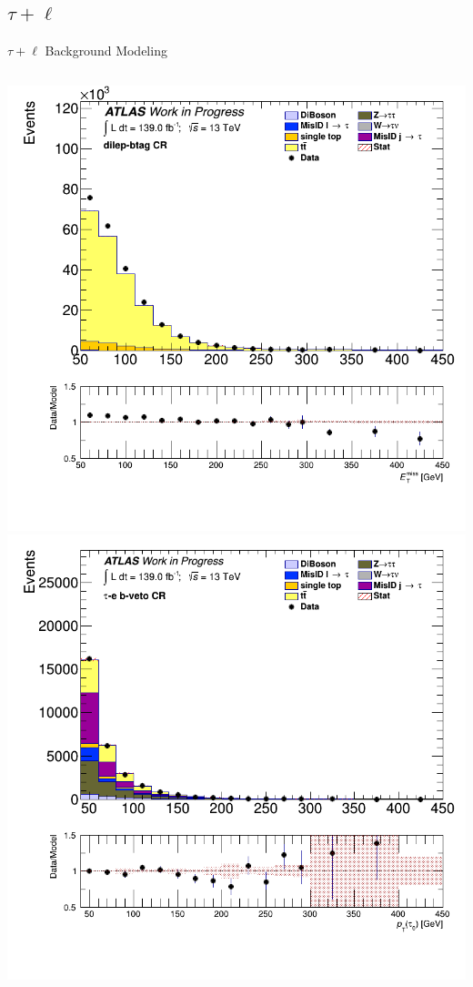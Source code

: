 \documentclass[aspectratio=169,xcolor=table]{beamer}
\begin{document}
    \subsection{$\tau+\ell$}

      \begin{frame}[t]{$\tau+\ell$ Background Modeling}
        \begin{columns}[t]

          \includegraphics[height=.45\textheight,keepaspectratio=true]{taulep_1p_3p/v09/met_et_DILEP_BTAG.png}
          \includegraphics[height=.45\textheight,keepaspectratio=true]{taulep_1p_3p/v09/tau_0_pt_TAUEL_BVETO.png}


\end{columns}
\end{frame}
\end{document}
